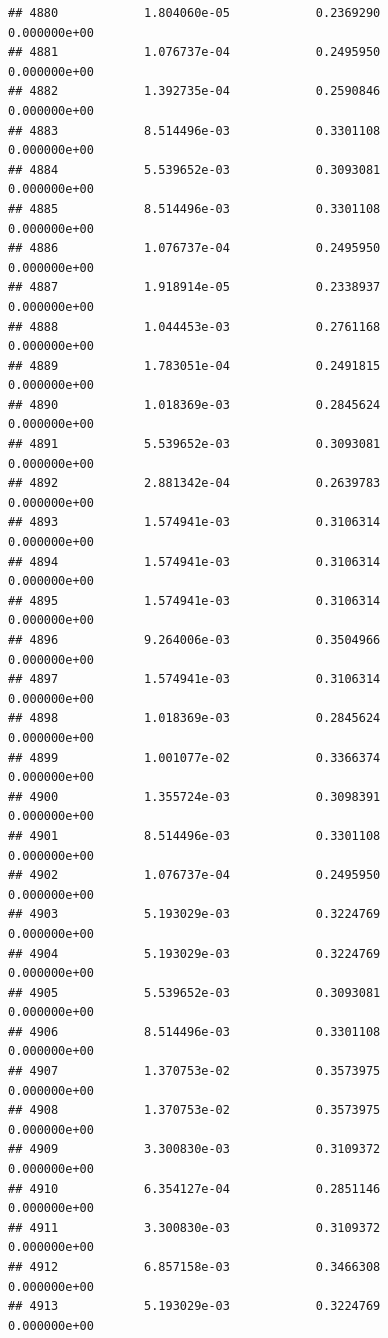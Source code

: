 \documentclass[
]{article}
\begin{document}
\begin{verbatim}
## 4880            1.804060e-05            0.2369290            0.000000e+00
## 4881            1.076737e-04            0.2495950            0.000000e+00
## 4882            1.392735e-04            0.2590846            0.000000e+00
## 4883            8.514496e-03            0.3301108            0.000000e+00
## 4884            5.539652e-03            0.3093081            0.000000e+00
## 4885            8.514496e-03            0.3301108            0.000000e+00
## 4886            1.076737e-04            0.2495950            0.000000e+00
## 4887            1.918914e-05            0.2338937            0.000000e+00
## 4888            1.044453e-03            0.2761168            0.000000e+00
## 4889            1.783051e-04            0.2491815            0.000000e+00
## 4890            1.018369e-03            0.2845624            0.000000e+00
## 4891            5.539652e-03            0.3093081            0.000000e+00
## 4892            2.881342e-04            0.2639783            0.000000e+00
## 4893            1.574941e-03            0.3106314            0.000000e+00
## 4894            1.574941e-03            0.3106314            0.000000e+00
## 4895            1.574941e-03            0.3106314            0.000000e+00
## 4896            9.264006e-03            0.3504966            0.000000e+00
## 4897            1.574941e-03            0.3106314            0.000000e+00
## 4898            1.018369e-03            0.2845624            0.000000e+00
## 4899            1.001077e-02            0.3366374            0.000000e+00
## 4900            1.355724e-03            0.3098391            0.000000e+00
## 4901            8.514496e-03            0.3301108            0.000000e+00
## 4902            1.076737e-04            0.2495950            0.000000e+00
## 4903            5.193029e-03            0.3224769            0.000000e+00
## 4904            5.193029e-03            0.3224769            0.000000e+00
## 4905            5.539652e-03            0.3093081            0.000000e+00
## 4906            8.514496e-03            0.3301108            0.000000e+00
## 4907            1.370753e-02            0.3573975            0.000000e+00
## 4908            1.370753e-02            0.3573975            0.000000e+00
## 4909            3.300830e-03            0.3109372            0.000000e+00
## 4910            6.354127e-04            0.2851146            0.000000e+00
## 4911            3.300830e-03            0.3109372            0.000000e+00
## 4912            6.857158e-03            0.3466308            0.000000e+00
## 4913            5.193029e-03            0.3224769            0.000000e+00

\end{verbatim}
\end{document}
